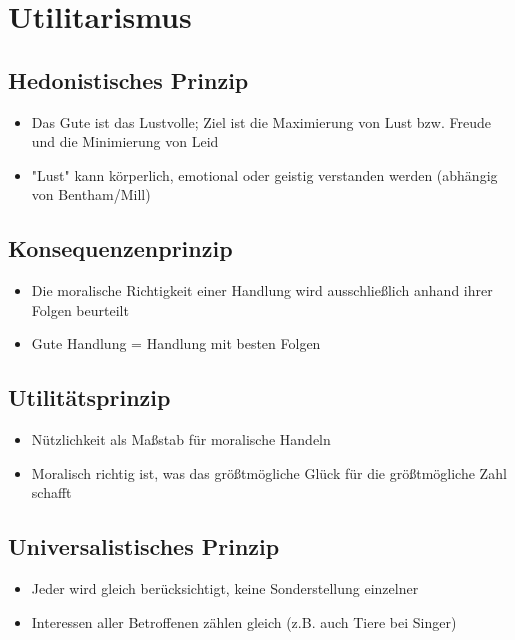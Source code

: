 
\section{Utilitarismus}

\subsection{Hedonistisches Prinzip}
\begin{itemize}
    \item Das Gute ist das Lustvolle; Ziel ist die Maximierung von Lust bzw. Freude und die Minimierung von Leid
    \item "Lust" kann körperlich, emotional oder geistig verstanden werden (abhängig von Bentham/Mill)
\end{itemize}

\subsection{Konsequenzenprinzip}
\begin{itemize}
    \item Die moralische Richtigkeit einer Handlung wird ausschließlich anhand ihrer Folgen beurteilt
    \item Gute Handlung = Handlung mit besten Folgen
\end{itemize}

\subsection{Utilitätsprinzip}
\begin{itemize}
    \item Nützlichkeit als Maßstab für moralische Handeln
    \item Moralisch richtig ist, was das größtmögliche Glück für die größtmögliche Zahl schafft
\end{itemize}

\subsection{Universalistisches Prinzip}
\begin{itemize}
    \item Jeder wird gleich berücksichtigt, keine Sonderstellung einzelner 
    \item Interessen aller Betroffenen zählen gleich (z.B. auch Tiere bei Singer)
\end{itemize}

